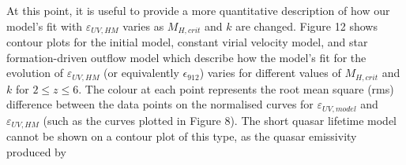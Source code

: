 \documentclass[12pt, twocolumn]{article}%
\begin{document}
At this point, it is useful to provide a more quantitative description of how our model's fit with $\varepsilon_{UV,HM}$ varies as $M_{H,crit}$ and $k$ are changed. Figure 12 shows contour plots for the initial model, constant virial velocity model, and star formation-driven outflow model which describe how the model's fit for the evolution of $\varepsilon_{UV,HM}$ (or equivalently $\epsilon_{912}$) varies for different values of $M_{H,crit}$ and $k$ for $2\leq z\leq6$. The colour at each point represents the root mean square (rms) difference between the data points on the normalised curves for $\varepsilon_{UV,model}$ and $\varepsilon_{UV,HM}$ (such as the curves plotted in Figure 8). The short quasar lifetime model cannot be shown on a contour plot of this type, as the quasar emissivity produced by

\onecolumngrid
\end{document}
